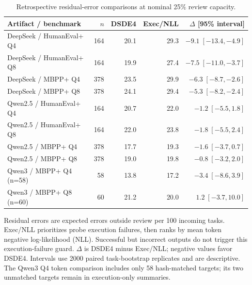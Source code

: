 \begin{table}[htbp]
\centering
\caption{Retrospective residual-error comparisons at nominal 25\% review capacity.}
\label{tab:retro-extended}
\footnotesize
\begin{tabular}{lrrrr}
\toprule
Artifact / benchmark & $n$ & DSDE4 & Exec/NLL & $\Delta$ [95\% interval] \\
\midrule
DeepSeek / HumanEval+ Q4 & 164 & 20.1 & 29.3 & $-9.1\;[-13.4, -4.9]$ \\
DeepSeek / HumanEval+ Q8 & 164 & 19.9 & 27.4 & $-7.5\;[-11.0, -3.7]$ \\
DeepSeek / MBPP+ Q4 & 378 & 23.5 & 29.9 & $-6.3\;[-8.7, -2.6]$ \\
DeepSeek / MBPP+ Q8 & 378 & 24.1 & 29.4 & $-5.3\;[-8.2, -2.4]$ \\
Qwen2.5 / HumanEval+ Q4 & 164 & 20.7 & 22.0 & $-1.2\;[-5.5, 1.8]$ \\
Qwen2.5 / HumanEval+ Q8 & 164 & 22.0 & 23.8 & $-1.8\;[-5.5, 2.4]$ \\
Qwen2.5 / MBPP+ Q4 & 378 & 17.7 & 19.3 & $-1.6\;[-3.7, 0.7]$ \\
Qwen2.5 / MBPP+ Q8 & 378 & 19.0 & 19.8 & $-0.8\;[-3.2, 2.0]$ \\
Qwen3 / MBPP+ Q4 (n=58) & 58 & 13.8 & 17.2 & $-3.4\;[-8.6, 3.9]$ \\
Qwen3 / MBPP+ Q8 (n=60) & 60 & 21.2 & 20.0 & $1.2\;[-3.7, 10.0]$ \\
\bottomrule
\end{tabular}
\par\vspace{4pt}\begin{minipage}{0.98\linewidth}\footnotesize Residual errors are expected errors outside review per 100 incoming tasks. Exec/NLL prioritizes probe execution failures, then ranks by mean token negative log-likelihood (NLL). Successful but incorrect outputs do not trigger this execution-failure guard. $\Delta$ is DSDE4 minus Exec/NLL; negative values favor DSDE4. Intervals use 2000 paired task-bootstrap replicates and are descriptive. The Qwen3 Q4 token comparison includes only 58 hash-matched targets; its two unmatched targets remain in execution-only summaries.\end{minipage}
\end{table}
